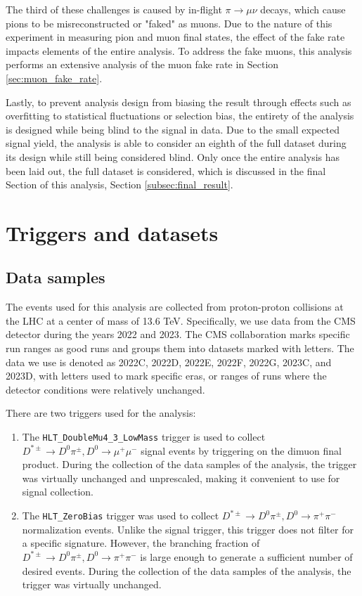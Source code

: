 The third of these challenges is caused by in-flight $\pi \to \mu \nu$ decays, which cause pions to be misreconstructed or "faked" as muons. Due to the nature of this experiment in measuring pion and muon final states, the effect of the fake rate impacts elements of the entire analysis. To address the fake muons, this analysis performs an extensive analysis of the muon fake rate in Section \ref{sec:muon_fake_rate}. 

Lastly, to prevent analysis design from biasing the result through effects such as overfitting to statistical fluctuations or selection bias, the entirety of the analysis is designed while being blind to the signal in data. Due to the small expected signal yield, the analysis is able to consider an eighth of the full dataset during its design while still being considered blind. Only once the entire analysis has been laid out, the full dataset is considered, which is discussed in the final Section of this analysis, Section \ref{subsec:final_result}. 

\section{Triggers and datasets}
\label{sec:triggers_and_datasets}

\subsection{Data samples}

\label{subsec:data_samples}

The events used for this analysis are collected from proton-proton collisions at the LHC at a center of mass of 13.6 TeV. Specifically, we use data from the CMS detector during the years 2022 and 2023. The CMS collaboration marks specific run ranges as good runs and groups them into datasets marked with letters. The data we use is denoted as 2022C, 2022D, 2022E, 2022F, 2022G, 2023C, and 2023D, with letters used to mark specific eras, or ranges of runs where the detector conditions were relatively unchanged. 

There are two triggers used for the analysis:
\begin{enumerate}
    \item The \texttt{HLT\_DoubleMu4\_3\_LowMass} trigger is used to collect $D^{*\pm} \to D^0 \pi^\pm, D^0 \to \mu^+ \mu^-$ signal events by triggering on the dimuon final product. During the collection of the data samples of the analysis, the trigger was virtually unchanged and unprescaled, making it convenient to use for signal collection.
    \item The \texttt{HLT\_ZeroBias} trigger was used to collect $D^{*\pm} \to D^0 \pi^\pm, D^0 \to \pi^+ \pi^-$ normalization events. Unlike the signal trigger, this trigger does not filter for a specific signature. However, the branching fraction of $D^{*\pm} \to D^0 \pi^\pm, D^0 \to \pi^+ \pi^-$ is large enough to generate a sufficient number of desired events. During the collection of the data samples of the analysis, the trigger was virtually unchanged.
\end{enumerate}

